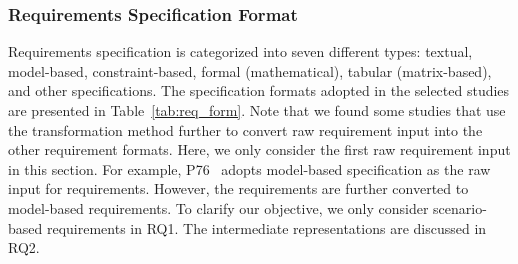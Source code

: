 \subsubsection{Requirements Specification Format}




Requirements specification is categorized into seven different types: textual, model-based, constraint-based, formal (mathematical), tabular (matrix-based), and other specifications. The specification formats adopted in the selected studies are presented in Table~\ref{tab:req_form}. Note that we found some studies that use the transformation method further to convert raw requirement input into the other requirement formats. Here, we only consider the first raw requirement input in this section. For example, P76~ adopts model-based specification as the raw input for requirements. However, the requirements are further converted to model-based requirements. To clarify our objective, we only consider scenario-based requirements in RQ1. The intermediate representations are discussed in RQ2.

